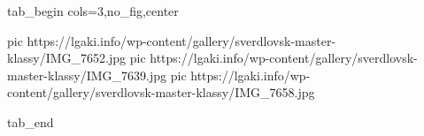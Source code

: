  
 
 
 
 


\ifcmt
  tab_begin cols=3,no_fig,center

     pic https://lgaki.info/wp-content/gallery/sverdlovsk-master-klassy/IMG_7652.jpg
     pic https://lgaki.info/wp-content/gallery/sverdlovsk-master-klassy/IMG_7639.jpg
     pic https://lgaki.info/wp-content/gallery/sverdlovsk-master-klassy/IMG_7658.jpg

  tab_end
\fi
